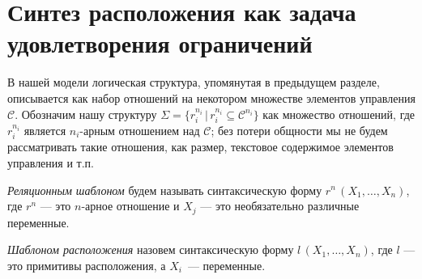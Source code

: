 
\section{Синтез расположения как задача удовлетворения ограничений}
\label{sec:guidelines}


В нашей модели логическая структура, упомянутая в предыдущем разделе, описывается как набор отношений на некотором множестве элементов управления $\mathcal{C}$. Обозначим нашу структуру $\Sigma=\{r^{n_i}_i\, |\, r^{n_i}_i\subseteq\mathcal{C}^{n_i}\}$ как множество отношений, где    $r^{n_i}_i$ является \mbox{$n_i$-арным} отношением над $\mathcal{C}$;
без потери общности мы не будем рассматривать такие отношения, как размер, текстовое содержимое элементов управления и т.п.


\emph{Реляционным шаблоном} будем называть синтаксическую форму $r^n\,(X_1,\dots,X_n)$, где $r^n$ --- это $n$-арное отношение и $X_j$ --- это необязательно различные переменные.


\emph{Шаблоном расположения} назовем синтаксическую форму $l\,(X_1,\dots,X_n)$, где $l$  --- это примитивы расположения, а $X_i$~--- переменные.


